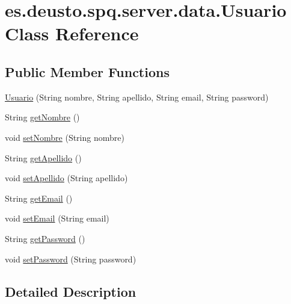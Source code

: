 \hypertarget{classes_1_1deusto_1_1spq_1_1server_1_1data_1_1_usuario}{}\section{es.\+deusto.\+spq.\+server.\+data.\+Usuario Class Reference}
\label{classes_1_1deusto_1_1spq_1_1server_1_1data_1_1_usuario}
\subsection*{Public Member Functions}
\begin{DoxyCompactItemize}
\item 
\hyperlink{classes_1_1deusto_1_1spq_1_1server_1_1data_1_1_usuario_ae09d27a19bc14bd511e6981ac3bd386b}{Usuario} (String nombre, String apellido, String email, String password)
\item 
String \hyperlink{classes_1_1deusto_1_1spq_1_1server_1_1data_1_1_usuario_adc3398b4226139a707a460a30eaa2068}{get\+Nombre} ()
\item 
void \hyperlink{classes_1_1deusto_1_1spq_1_1server_1_1data_1_1_usuario_adafbc6f6cb7ac76c68b5c34be832d6e5}{set\+Nombre} (String nombre)
\item 
String \hyperlink{classes_1_1deusto_1_1spq_1_1server_1_1data_1_1_usuario_a39619231643dccc5fc0d29385d1c227f}{get\+Apellido} ()
\item 
void \hyperlink{classes_1_1deusto_1_1spq_1_1server_1_1data_1_1_usuario_a4c2d4eb782097a23b5f6a25f085d1732}{set\+Apellido} (String apellido)
\item 
String \hyperlink{classes_1_1deusto_1_1spq_1_1server_1_1data_1_1_usuario_af2c0b8e4fc4ce67e58e12bdc92a365e8}{get\+Email} ()
\item 
void \hyperlink{classes_1_1deusto_1_1spq_1_1server_1_1data_1_1_usuario_af183b4bc83c84a64b5a23b9a4e8ec64c}{set\+Email} (String email)
\item 
String \hyperlink{classes_1_1deusto_1_1spq_1_1server_1_1data_1_1_usuario_a1324d9387c209bf29ff02e6456db1f48}{get\+Password} ()
\item 
void \hyperlink{classes_1_1deusto_1_1spq_1_1server_1_1data_1_1_usuario_a4b4b069d64a9357b04b4f5ef27159315}{set\+Password} (String password)
\end{DoxyCompactItemize}


\subsection{Detailed Description}


